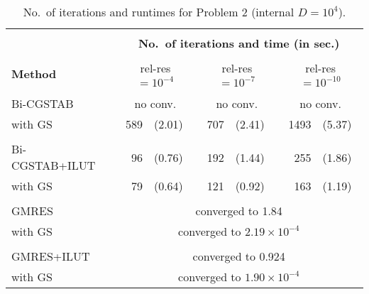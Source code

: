 \documentclass[12pt,a4paper]{article}
\newcounter{i}
\def\time{\!\times\!}
\def\noconv{\multicolumn{2}{|c|}{no conv.}}
\begin{document}
\begin{table}[!h]
\centering
\begin{tabular}{|l|rl|rl|rl|}
\hline
&\multicolumn{6}{|c|}{}\\[-12pt]
&\multicolumn{6}{|c|}{\bf No.\ of iterations and time (in sec.)}\\
\hline&&&&&&\\[-11pt]
{\bf Method} & \multicolumn{2}{|c|}{rel-res $=\!10^{-4}$}
& \multicolumn{2}{|c|}{rel-res $=\!10^{-7}$}
& \multicolumn{2}{|c|}{rel-res $=\!10^{-10}$} \\
\hline&&&&&&\\[-12pt]
Bi-CGSTAB       & \noconv      & \noconv      & \noconv      \\
with GS         & 589 & (2.01) & 707 & (2.41) & 1493 & (5.37) \\
\hline&&&&&&\\[-12pt]
Bi-CGSTAB+ILUT  & 96  & (0.76) & 192 & (1.44) & 255 & (1.86) \\
with GS         & 79  & (0.64) & 121 & (0.92) & 163 & (1.19) \\
\hline
&\multicolumn{6}{|c|}{}\\[-12pt]
GMRES & \multicolumn{6}{|c|}{converged to 1.84} \\
with GS & 
\multicolumn{6}{|c|}{converged to $2.19\time10^{-4}$} \\
\hline
&\multicolumn{6}{|c|}{}\\[-12pt]
GMRES+ILUT & \multicolumn{6}{|c|}{converged to 0.924} \\
with GS    & 
\multicolumn{6}{|c|}{converged to $1.90\time10^{-4}$} \\
\hline
\end{tabular}
\caption{No.\ of iterations and runtimes for Problem 2
(internal $D=10^4$).}
\label{tbl2a}
\end{table}
\end{document}
